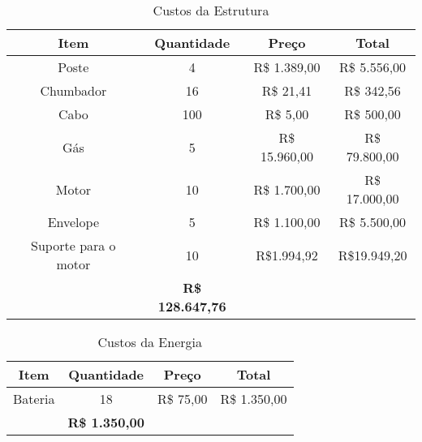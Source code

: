 \begin{table}[]
\centering
\caption{Custos da Estrutura}
\label{tab:CustosEstrutura}
\begin{tabular}{|c|c|c|c|}
\hline
\rowcolor[HTML]{FFFFFF} 
{\color[HTML]{000000} \textbf{Item}} & \textbf{Quantidade} & \textbf{Preço} & \textbf{Total}          \\ \hline
Poste                                & 4                   & R\$ 1.389,00   & R\$ 5.556,00            \\ \hline
Chumbador                            & 16                  & R\$ 21,41      & R\$ 342,56              \\ \hline
Cabo                                 & 100                 & R\$ 5,00       & R\$ 500,00              \\ \hline
Gás                                  & 5                   & R\$ 15.960,00  & R\$ 79.800,00           \\ \hline
Motor                                & 10                  & R\$ 1.700,00   & R\$ 17.000,00           \\ \hline
Envelope                             & 5                   & R\$ 1.100,00   & R\$ 5.500,00            \\ \hline
Suporte para o motor                 & 10                  & R\$1.994,92    & R\$19.949,20            \\ \hline
\rowcolor[HTML]{C0C0C0} 
\multicolumn{3}{|c|}{\cellcolor[HTML]{C0C0C0}\textbf{Total}}                & \textbf{R\$ 128.647,76} \\ \hline
\end{tabular}
\end{table}

\begin{table}[]
\centering
\caption{Custos da Energia}
\label{tab:custosEnergia}
\begin{tabular}{|c|c|c|c|}
\hline
\rowcolor[HTML]{FFFFFF} 
{\color[HTML]{000000} \textbf{Item}} & \textbf{Quantidade} & \textbf{Preço} & \textbf{Total}        \\ \hline
Bateria                              & 18                  & R\$ 75,00      & R\$ 1.350,00          \\ \hline
\rowcolor[HTML]{C0C0C0} 
\multicolumn{3}{|c|}{\cellcolor[HTML]{C0C0C0}\textbf{Total}}                & \textbf{R\$ 1.350,00} \\ \hline
\end{tabular}
\end{table}

